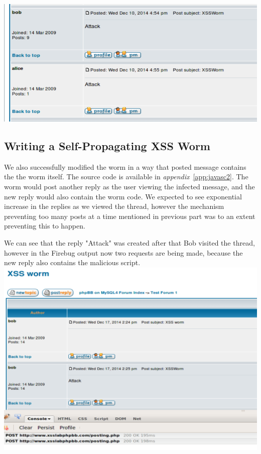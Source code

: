 \documentclass[12pt, a4paper, pdflatex]{article}
\begin{document}
\includegraphics[width=.95\textwidth]{gfx/xss/task5-worm-working}

\subsection{Writing a Self-Propagating XSS Worm}
We also successfully modified the worm in a way that posted message contains the the worm itself. The source code is available in \emph{appendix}~\ref{app:javasc2}.
The worm would post another reply as the user viewing the infected message, and the new reply would also contain the worm code. We expected to see exponential increase in the replies as we viewed the thread, however the mechanism preventing too many posts at a time mentioned in previous part was to an extent preventing this to happen.

We can see that the reply "Attack" was created after that Bob visited the thread, however in the Firebug output now two requests are being made, because the new reply also contains the malicious script.\\
\includegraphics[width=.95\textwidth]{gfx/xss/task6}
\end{document}
